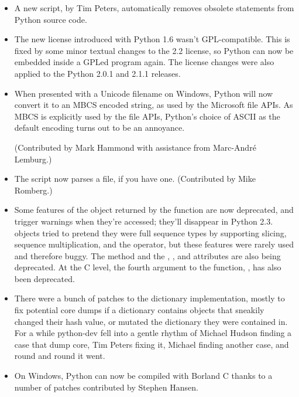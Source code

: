\documentclass{howto}
\begin{document}
\begin{itemize}
  \item A new script,  by Tim
  Peters, automatically removes obsolete  statements
  from Python source code.

  \item The new license introduced with Python 1.6 wasn't
  GPL-compatible.  This is fixed by some minor textual changes to the
  2.2 license, so Python can now be embedded inside a GPLed program
  again.  The license changes were also applied to the Python 2.0.1
  and 2.1.1 releases.

  \item When presented with a Unicode filename on Windows, Python will
  now convert it to an MBCS encoded string, as used by the Microsoft
  file APIs.  As MBCS is explicitly used by the file APIs, Python's
  choice of ASCII as the default encoding turns out to be an
  annoyance.

  (Contributed by Mark Hammond with assistance from Marc-Andr\'e
  Lemburg.)

  \item The  script
  now parses a  file, if you have one.
  (Contributed by Mike Romberg.) 

  \item Some features of the object returned by the
   function are now deprecated, and trigger
  warnings when they're accessed; they'll disappear in Python 2.3.
   objects tried to pretend they were full sequence
  types by supporting slicing, sequence multiplication, and the
   operator, but these features were rarely used and
  therefore buggy.  The  method and the
  , , and  attributes are also
  being deprecated.  At the C level, the fourth argument to the
   function, , has also been
  deprecated.

  \item There were a bunch of patches to the dictionary
  implementation, mostly to fix potential core dumps if a dictionary
  contains objects that sneakily changed their hash value, or mutated
  the dictionary they were contained in. For a while python-dev fell
  into a gentle rhythm of Michael Hudson finding a case that dump
  core, Tim Peters fixing it, Michael finding another case, and round
  and round it went.   

  \item On Windows, Python can now be compiled with Borland C thanks 
  to a number of patches contributed by Stephen Hansen.
  

\end{itemize}
\end{document}
